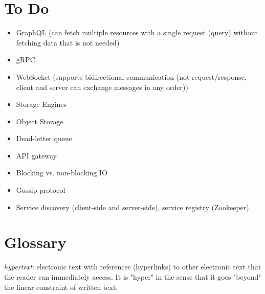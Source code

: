 \documentclass[12pt, titlepage]{article}
\begin{document}
\section{To Do}

\begin{itemize}
  \item GraphQL (can fetch multiple resources with a single request (query) without fetching data that is not needed)
  \item gRPC
  \item WebSocket (supports bidirectional communication (not request/response, client and server can exchange messages in any order))
  \item Storage Engines
  \item Object Storage
  \item Dead-letter queue
  \item API gateway
  \item Blocking vs. non-blocking IO
  \item Gossip protocol
  \item Service discovery (client-side and server-side), service registry (Zookeeper)
\end{itemize}

\appendix
\newpage

\section{Glossary}

\textit{hypertext}: electronic text with references (hyperlinks) to other electronic text that the reader can immediately access. It is "hyper" in the sense that it goes "beyond" the linear constraint of written text.
\end{document}
